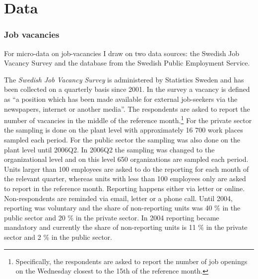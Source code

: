 \section{Data}
\label{sec:data}

\subsubsection{Job vacancies}

For micro-data on job-vacancies I draw on two data sources: the Swedish Job Vacancy Survey and the database from the Swedish Public Employment Service. 

The \textit{Swedish Job Vacancy Survey} is administered by Statistics Sweden and has been collected on a quarterly basis since 2001. In the survey a vacancy is defined as 
\enquote{a position which has been made available for external job-seekers via the newspapers, internet or another media}. The respondents are asked to report the number of vacancies in the middle of the reference month.\footnote{Specifically, the respondents are asked to report the number of job openings on the Wednesday closest to the 15th of the reference month.} For the private sector the sampling is done on the plant level with approximately 16 700 work places sampled each period. For the public sector the sampling was also done on the plant level until 2006Q2. In 2006Q2 the sampling was changed to the organizational level and on this level 650 organizations are sampled each period. Units larger than 100 employees are asked to do the reporting for each month of the relevant quarter, whereas units with less than 100 employees only are asked to report in the reference month. Reporting happens either via letter or online. Non-respondents are reminded via email, letter or a phone call. Until 2004, reporting was voluntary and the share of non-reporting units was 40 \% in the public sector and 20 \% in the private sector. In 2004 reporting became mandatory and currently the share of non-reporting units is 11 \% in the private sector and 2 \% in the public sector.

